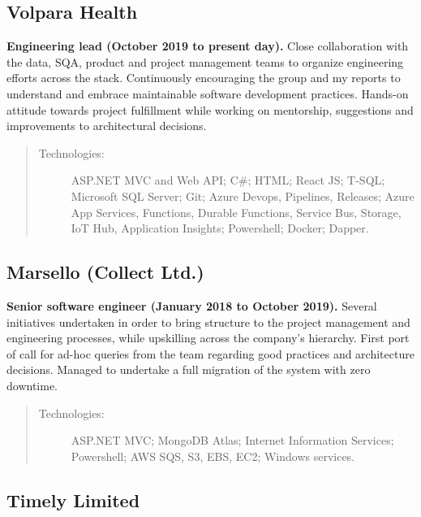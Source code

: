 \subsection*{Volpara Health}

\textbf{Engineering lead (October 2019 to present day).} Close collaboration with the data, SQA, product and project management teams to organize engineering efforts across the stack. Continuously encouraging the group and my reports to understand and embrace maintainable software development practices. Hands-on attitude towards project fulfillment while working on mentorship, suggestions and improvements to architectural decisions.

\begin{quote}
\begin{description}
    \item[Technologies:] ASP.NET MVC and Web API; C\#; HTML; React JS; T-SQL; Microsoft SQL Server; Git; Azure Devops, Pipelines, Releases; Azure App Services, Functions, Durable Functions, Service Bus, Storage, IoT Hub, Application Insights; Powershell; Docker; Dapper.
\end{description}
\end{quote}

\subsection*{Marsello (Collect Ltd.)}

\textbf{Senior software engineer (January 2018 to October 2019).} Several initiatives undertaken in order to bring structure to the project management and engineering processes, while upskilling across the company's hierarchy. First port of call for ad-hoc queries from the team regarding good practices and architecture decisions. Managed to undertake a full migration of the system with zero downtime.

\begin{quote}
\begin{description}
    \item[Technologies:] ASP.NET MVC; MongoDB Atlas; Internet Information Services; Powershell; AWS SQS, S3, EBS, EC2; Windows services.
\end{description}
\end{quote}

\subsection*{Timely Limited}

